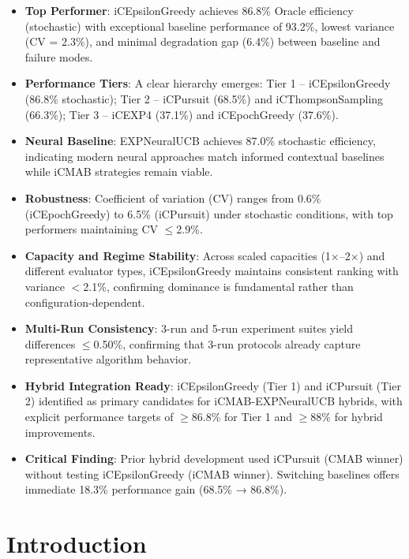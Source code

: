 \documentclass[12pt,a4paper]{article}
\newcommand{\primarytext}[1]{\textcolor{primaryblue}{\textbf{#1}}}
\newcommand{\secondarytext}[1]{\textcolor{secondaryblue}{\textbf{#1}}}
\newcommand{\success}[1]{\textcolor{accentgreen}{\textbf{#1}}}
\newcommand{\warning}[1]{\textcolor{warningred}{\textbf{#1}}}
\newcommand{\legacy}[1]{\textcolor{legacycolor}{\textbf{#1}}}
\begin{document}
\begin{tcolorbox}[colback=highlightgray,colframe=primaryblue,title=\textbf{Executive Summary}]
\begin{itemize}
\item \primarytext{Top Performer}: iCEpsilonGreedy achieves 86.8\% Oracle efficiency (stochastic) with exceptional baseline performance of 93.2\%, lowest variance (CV = 2.3\%), and minimal degradation gap (6.4\%) between baseline and failure modes.
\item \secondarytext{Performance Tiers}: A clear hierarchy emerges: Tier 1 -- iCEpsilonGreedy (86.8\% stochastic); Tier 2 -- iCPursuit (68.5\%) and iCThompsonSampling (66.3\%); Tier 3 -- iCEXP4 (37.1\%) and iCEpochGreedy (37.6\%).
\item \legacy{Neural Baseline}: EXPNeuralUCB achieves 87.0\% stochastic efficiency, indicating modern neural approaches match informed contextual baselines while iCMAB strategies remain viable.
\item \success{Robustness}: Coefficient of variation (CV) ranges from 0.6\% (iCEpochGreedy) to 6.5\% (iCPursuit) under stochastic conditions, with top performers maintaining CV $\leq$2.9\%.
\item \success{Capacity and Regime Stability}: Across scaled capacities (1$\times$--2$\times$) and different evaluator types, iCEpsilonGreedy maintains consistent ranking with variance $<$2.1\%, confirming dominance is fundamental rather than configuration-dependent.
\item \success{Multi-Run Consistency}: 3-run and 5-run experiment suites yield differences $\leq$0.50\%, confirming that 3-run protocols already capture representative algorithm behavior.
\item \primarytext{Hybrid Integration Ready}: iCEpsilonGreedy (Tier 1) and iCPursuit (Tier 2) identified as primary candidates for iCMAB-EXPNeuralUCB hybrids, with explicit performance targets of $\geq$86.8\% for Tier 1 and $\geq$88\% for hybrid improvements.
\item \warning{Critical Finding}: Prior hybrid development used iCPursuit (CMAB winner) without testing iCEpsilonGreedy (iCMAB winner). Switching baselines offers immediate 18.3\% performance gain (68.5\% → 86.8\%).
\end{itemize}
\end{tcolorbox}

\newpage
\section{Introduction}
\end{document}
